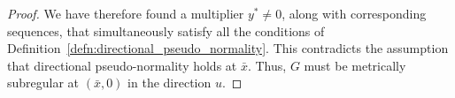 \documentclass[10pt,a4paper]{amsart}
\begin{document}
\begin{proof}
    We have therefore found a multiplier $y^* \neq 0$, along with corresponding sequences, that simultaneously satisfy all the conditions of Definition~\ref{defn:directional_pseudo_normality}. This contradicts the assumption that directional pseudo-normality holds at $\bar{x}$. Thus, $G$ must be metrically subregular at $(\bar{x}, 0)$ in the direction $u$.  
\end{proof}
\end{document}
